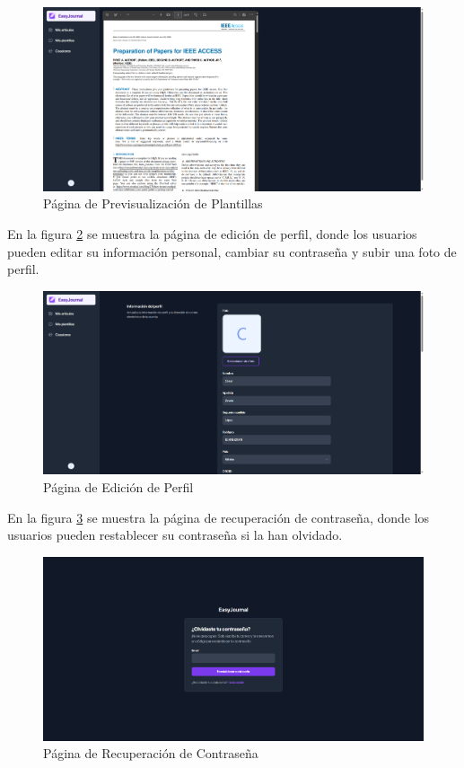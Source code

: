 \begin{figure}[H]
    \centering
    \includegraphics[width=1\textwidth]{IMAGENES/captura-5.png}
    \caption{Página de Previsualización de Plantillas}
    \label{fig:captura-5}
\end{figure}

En la figura \ref{fig:captura-6} se muestra la página de edición de perfil, donde los usuarios pueden editar su información personal, cambiar su contraseña y subir una foto de perfil.

\begin{figure}[H]
    \centering
    \includegraphics[width=1\textwidth]{IMAGENES/captura-6.png}
    \caption{Página de Edición de Perfil}
    \label{fig:captura-6}
\end{figure}

En la figura \ref{fig:captura-7} se muestra la página de recuperación de contraseña, donde los usuarios pueden restablecer su contraseña si la han olvidado.

\begin{figure}[H]
    \centering
    \includegraphics[width=1\textwidth]{IMAGENES/captura-7.png}
    \caption{Página de Recuperación de Contraseña}
    \label{fig:captura-7}
\end{figure}

